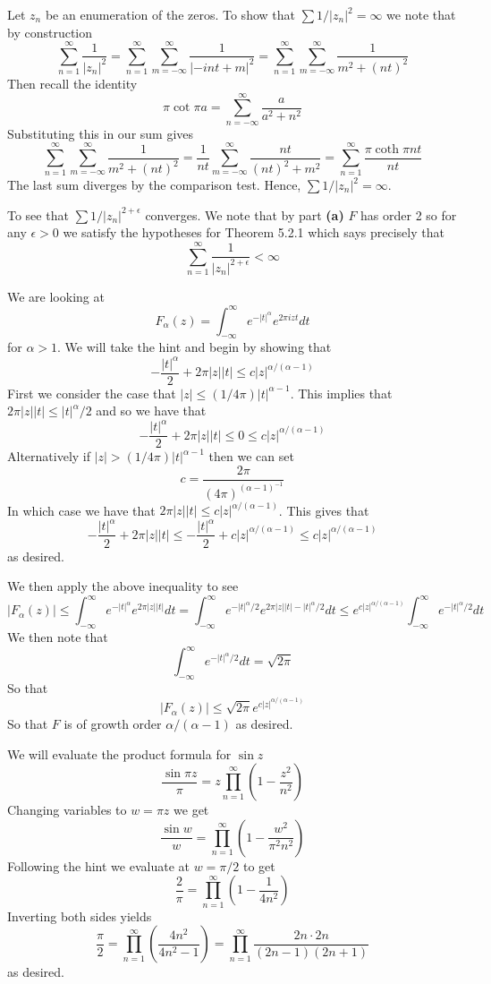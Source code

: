 \documentclass{article}
\newcommand{\exercise}[1]{\noindent{\textbf{Exercise #1:}}}
\begin{document}
\begin{enumerate}
  Let $z_n$ be an enumeration of the zeros. To show that $\sum 1/|z_n|^2
  = \infty$ we note that by construction
  \[
  \sum_{n=1}^\infty \frac{1}{|z_n|^2} =
  \sum_{n=1}^\infty\sum_{m=-\infty}^\infty \frac{1}{|-int+m|^2} =
  \sum_{n=1}^\infty\sum_{m=-\infty}^{\infty} \frac{1}{m^2 + (nt)^2}
  \]
  Then recall the identity
  \[
  \pi\cot\pi a = \sum_{n=-\infty}^\infty \frac{a}{a^2 + n^2}
  \]
  Substituting this in our sum gives
  \[
  \sum_{n=1}^\infty\sum_{m=-\infty}^{\infty} \frac{1}{m^2 + (nt)^2} =
  \frac{1}{nt}\sum_{m=-\infty}^\infty \frac{nt}{(nt)^2 + m^2} =
  \sum_{n=1}^\infty \frac{\pi\coth \pi nt}{nt}
  \]
  The last sum diverges by the comparison test. Hence, $\sum 1/|z_n|^2
  = \infty$.

  To see that $\sum 1/|z_n|^{2+\epsilon}$ converges. We note that by
  part \textbf{(a)} $F$ has order 2 so for any $\epsilon > 0$ we
  satisfy the hypotheses for Theorem 5.2.1 which says precisely that
  \[
  \sum_{n=1}^\infty \frac{1}{|z_n|^{2+\epsilon}} < \infty
  \]
\end{enumerate}

\exercise{5.6.5}

We are looking at
\[
F_\alpha(z) = \int_{-\infty}^\infty e^{-|t|^\alpha}e^{2\pi izt}dt
\]
for $\alpha > 1$. We will take the hint and begin by showing that
\[
-\frac{|t|^\alpha}{2} + 2\pi |z||t| \leq c|z|^{\alpha / (\alpha-1)}
\]
First we consider the case that $|z| \leq
(1/4\pi)|t|^{\alpha-1}$. This implies that $2\pi |z||t| \leq
|t|^\alpha/2$ and so we have that
\[
-\frac{|t|^\alpha}{2} + 2\pi |z||t| \leq 0 \leq
c|z|^{\alpha/(\alpha-1)}
\]
Alternatively if $|z| > (1/4\pi)|t|^{\alpha-1}$ then we can set
\[
c = \frac{2\pi}{(4\pi)^{(\alpha-1)^{-1}}}
\]
In which case we have that $2\pi |z||t| \leq
c|z|^{\alpha/(\alpha-1)}$. This gives that
\[
-\frac{|t|^\alpha}{2} + 2\pi |z||t| \leq -\frac{|t|^\alpha}{2} +
c|z|^{\alpha/(\alpha-1)} \leq c|z|^{\alpha/(\alpha-1)}
\]
as desired.

We then apply the above inequality to see
\[
|F_\alpha(z)| \leq \int_{-\infty}^\infty
e^{-|t|^\alpha}e^{2\pi|z||t|}dt = \int_{-\infty}^\infty
e^{-|t|^\alpha/2}e^{2\pi|z||t|-|t|^\alpha/2}dt \leq
e^{c|z|^{\alpha/(\alpha-1)}}\int_{-\infty}^\infty e^{-|t|^\alpha/2}dt
\]
We then note that
\[
\int_{-\infty}^\infty e^{-|t|^\alpha/2}dt = \sqrt{2\pi}
\]
So that
\[
|F_\alpha(z)| \leq \sqrt{2\pi}e^{c|z|^{\alpha/(\alpha-1)}}
\]
So that $F$ is of growth order $\alpha/(\alpha-1)$ as desired.

\exercise{5.6.6}

We will evaluate the product formula for $\sin z$
\[
\frac{\sin \pi z}{\pi} = z \prod_{n=1}^\infty \left(1 - \frac{z^2}{n^2}\right)
\]
Changing variables to $w = \pi z$ we get
\[
\frac{\sin w}{w} = \prod_{n=1}^\infty\left(1 - \frac{w^2}{\pi^2n^2}\right)
\]
Following the hint we evaluate at $w = \pi/2$ to get
\[
\frac{2}{\pi} = \prod_{n=1}^\infty\left(1 - \frac{1}{4n^2}\right)
\]
Inverting both sides yields
\[
\frac{\pi}{2} = \prod_{n=1}^\infty\left(\frac{4n^2}{4n^2-1}\right) =
\prod_{n=1}^\infty \frac{2n\cdot 2n}{(2n-1)(2n+1)}
\]
as desired.
\end{document}
